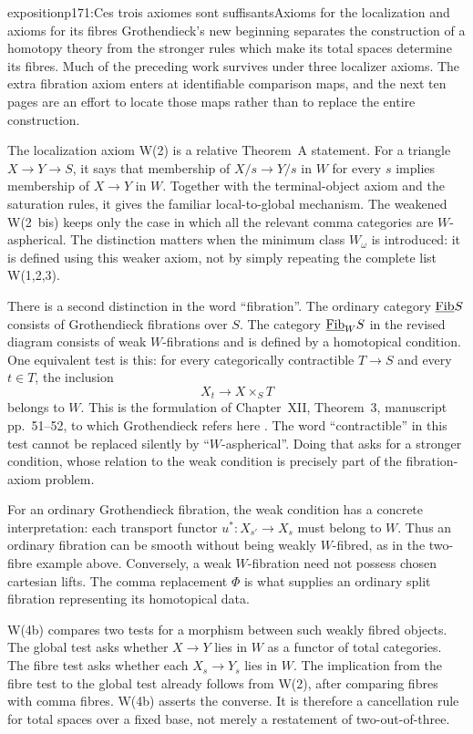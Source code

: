 \begin{dcomment}{exposition}{p171:Ces trois axiomes sont suffisants}{Axioms for the localization and axioms for its fibres}
Grothendieck's new beginning separates the construction of a homotopy theory from the stronger rules which make its total spaces determine its fibres. Much of the preceding work survives under three localizer axioms. The extra fibration axiom enters at identifiable comparison maps, and the next ten pages are an effort to locate those maps rather than to replace the entire construction.

The localization axiom W(2) is a relative Theorem~A statement. For a triangle $X\to Y\to S$, it says that membership of $X/s\to Y/s$ in $W$ for every $s$ implies membership of $X\to Y$ in $W$. Together with the terminal-object axiom and the saturation rules, it gives the familiar local-to-global mechanism. The weakened W(2~bis) keeps only the case in which all the relevant comma categories are $W$-aspherical. The distinction matters when the minimum class $W_\omega$ is introduced: it is defined using this weaker axiom, not by simply repeating the complete list W(1,2,3).

There is a second distinction in the word ``fibration''. The ordinary category $\underline{\mathrm{Fib}} S$ consists of Grothendieck fibrations over $S$. The category $\underline{\mathrm{Fib}}_W S$ in the revised diagram consists of weak $W$-fibrations and is defined by a homotopical condition. One equivalent test is this: for every categorically contractible $T\to S$ and every $t\in T$, the inclusion
\[
 X_t\longrightarrow X\times_ST
\]
belongs to $W$. This is the formulation of Chapter~XII, Theorem~3, manuscript pp.~51--52, to which Grothendieck refers here \citep{Grothendieck1990XIIa}. The word ``contractible'' in this test cannot be replaced silently by ``$W$-aspherical''. Doing that asks for a stronger condition, whose relation to the weak condition is precisely part of the fibration-axiom problem.

For an ordinary Grothendieck fibration, the weak condition has a concrete interpretation: each transport functor $u^*:X_{s'}\to X_s$ must belong to $W$. Thus an ordinary fibration can be smooth without being weakly $W$-fibred, as in the two-fibre example above. Conversely, a weak $W$-fibration need not possess chosen cartesian lifts. The comma replacement $\Phi$ is what supplies an ordinary split fibration representing its homotopical data.

W(4b) compares two tests for a morphism between such weakly fibred objects. The global test asks whether $X\to Y$ lies in $W$ as a functor of total categories. The fibre test asks whether each $X_s\to Y_s$ lies in $W$. The implication from the fibre test to the global test already follows from W(2), after comparing fibres with comma fibres. W(4b) asserts the converse. It is therefore a cancellation rule for total spaces over a fixed base, not merely a restatement of two-out-of-three.


\end{dcomment}
